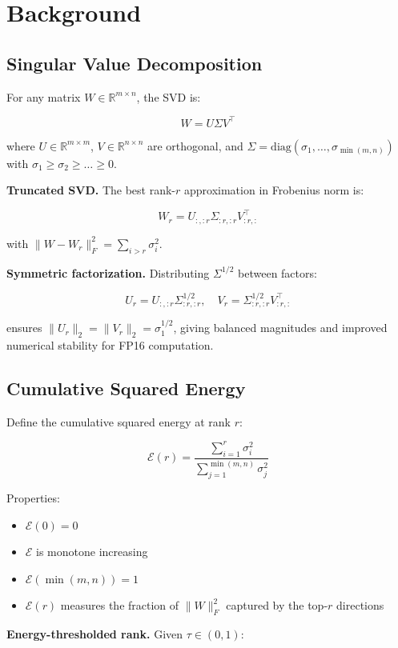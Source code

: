 
\section{Background}

\subsection{Singular Value Decomposition}

For any matrix $W \in \mathbb{R}^{m \times n}$, the SVD is:

\[
W = U \Sigma V^\top
\tag{3.1}
\]

where $U \in \mathbb{R}^{m \times m}$, $V \in \mathbb{R}^{n \times n}$ are 
orthogonal, and $\Sigma = \mathrm{diag}(\sigma_1, \dots, \sigma_{\min(m,n)})$ 
with $\sigma_1 \geq \sigma_2 \geq \dots \geq 0$.

\textbf{Truncated SVD.} The best rank-$r$ approximation in Frobenius norm is:

\[
W_r = U_{:, :r} \Sigma_{:r, :r} V_{:r, :}^\top
\tag{3.2}
\]

with $\|W - W_r\|_F^2 = \sum_{i > r} \sigma_i^2$.

\textbf{Symmetric factorization.} Distributing $\Sigma^{1/2}$ between factors:

\[
U_r = U_{:, :r} \Sigma_{:r, :r}^{1/2}, \quad
V_r = \Sigma_{:r, :r}^{1/2} V_{:r, :}^\top
\tag{3.3}
\]

ensures $\|U_r\|_2 = \|V_r\|_2 = \sigma_1^{1/2}$, giving balanced magnitudes 
and improved numerical stability for FP16 computation.

\subsection{Cumulative Squared Energy}

Define the cumulative squared energy at rank $r$:

\[
\mathcal{E}(r) = \frac{\sum_{i=1}^{r} \sigma_i^2}{\sum_{j=1}^{\min(m,n)} \sigma_j^2}
\tag{3.4}
\]

Properties:
\begin{itemize}
\item $\mathcal{E}(0) = 0$
\item $\mathcal{E}$ is monotone increasing
\item $\mathcal{E}(\min(m, n)) = 1$
\item $\mathcal{E}(r)$ measures the fraction of $\|W\|_F^2$ captured by the top-$r$ directions

\end{itemize}
\textbf{Energy-thresholded rank.} Given $\tau \in (0, 1)$:

